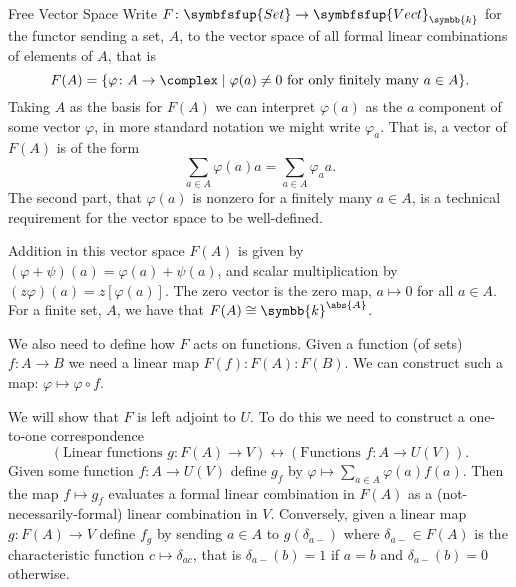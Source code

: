 \documentclass[fleqn]{NotesClass}
\makeatletter
\newcommand{\c@egory}[1]{\symbfsfup{#1}}
\newcommand{\Set}{\c@egory{Set}}
\renewcommand{\field}{\symbb{k}}
\newcommand{\Vect}[1][\field]{{\c@egory{Vect}_{#1}}}
\newcommand{\isomorphic}{\cong}
\makeatother
\begin{document}
\begin{appendices}
\begin{exm}{Free Vector Space}{}
            Write \(F \colon \Set \to \Vect\) for the functor sending a set, \(A\), to the vector space of all formal linear combinations of elements of \(A\), that is
            \begin{equation}
                F(A) = \{\varphi \colon A \to \complex \mid \varphi(a) \ne 0 \text{ for only finitely many } a \in A\}.
            \end{equation}
            Taking \(A\) as the basis for \(F(A)\) we can interpret \(\varphi(a)\) as the \(a\) component of some vector \(\varphi\), in more standard notation we might write \(\varphi_a\).
            That is, a vector of \(F(A)\) is of the form
            \begin{equation}
                \sum_{a \in A} \varphi(a) a = \sum_{a \in A} \varphi_a a.
            \end{equation}
            The second part, that \(\varphi(a)\) is nonzero for a finitely many \(a \in A\), is a technical requirement for the vector space to be well-defined.
            
            Addition in this vector space \(F(A)\) is given by \((\varphi + \psi)(a) = \varphi(a) + \psi(a)\), and scalar multiplication by \((z\varphi)(a) = z[\varphi(a)]\).
            The zero vector is the zero map, \(a \mapsto 0\) for all \(a \in A\).
            For a finite set, \(A\), we have that \(F(A) \isomorphic \field^{\abs{A}}\).
            
            We also need to define how \(F\) acts on functions.
            Given a function (of sets) \(f \colon A \to B\) we need a linear map \(F(f) \colon F(A) \colon F(B)\).
            We can construct such a map: \(\varphi \mapsto \varphi \circ f\).
            
            We will show that \(F\) is left adjoint to \(U\).
            To do this we need to construct a one-to-one correspondence
            \begin{equation}
                (\text{Linear functions } g\colon F(A) \to V) \leftrightarrow (\text{Functions } f\colon A \to U(V)).
            \end{equation}
            Given some function \(f\colon A \to U(V)\) define \(g_f\) by \(\varphi \mapsto \sum_{a\in A} \varphi(a)f(a)\).
            Then the map \(f \mapsto g_f\) evaluates a formal linear combination in \(F(A)\) as a (not-necessarily-formal) linear combination in \(V\).
            Conversely, given a linear map \(g \colon F(A) \to V\) define \(f_g\) by sending \(a \in A\) to \(g(\delta_{a-})\) where \(\delta_{a-} \in F(A)\) is the characteristic function \(c \mapsto \delta_{ac}\), that is \(\delta_{a-}(b) = 1\) if \(a = b\) and \(\delta_{a-}(b) = 0\) otherwise.
            

\end{exm}
\end{appendices}
\end{document}

